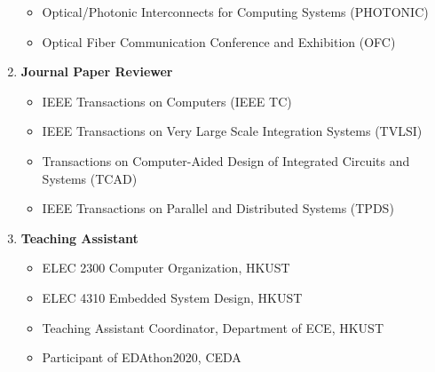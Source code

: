 \documentclass{mycv}
\begin{document}
\begin{enumerate}[label={}]
\begin{itemize}
	\item Optical/Photonic Interconnects for Computing Systems (PHOTONIC)
	\item Optical Fiber Communication Conference and Exhibition (OFC)
  \end{itemize}
  \item \textbf{Journal Paper Reviewer}
  \begin{itemize}
  	\item IEEE Transactions on Computers (IEEE TC)
  	\item IEEE Transactions on Very Large Scale Integration Systems (TVLSI)
  	\item Transactions on Computer-Aided Design of Integrated Circuits and Systems (TCAD)
  	\item IEEE Transactions on Parallel and Distributed Systems (TPDS)
  \end{itemize}
  \item \textbf{Teaching Assistant}
  \begin{itemize}
    \item ELEC 2300 Computer Organization, HKUST 
    \item ELEC 4310 Embedded System Design, HKUST 
    \item Teaching Assistant Coordinator, Department of ECE, HKUST 
    \item Participant of EDAthon2020, CEDA 
  \end{itemize}
\end{enumerate}
\end{document}
